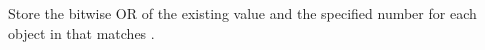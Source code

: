 Store the bitwise OR of the existing value and the specified number for each
object in  that matches .


